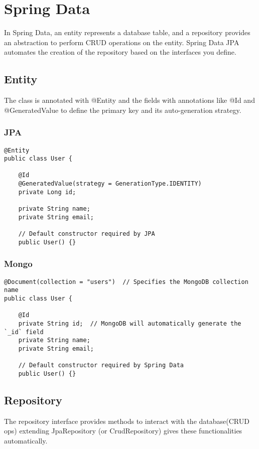 \documentclass[a4paper, 12pt]{article}
\begin{document}
    \newpage


    \section{Spring Data}
    In Spring Data, an entity represents a database table, and a repository provides an abstraction to perform CRUD operations on the entity. Spring Data JPA automates the creation of the repository based on the interfaces you define.

    \subsection{Entity}
    The class is annotated with @Entity and the fields with annotations like @Id and @GeneratedValue to define the primary key and its auto-generation strategy.

    \subsubsection{JPA}
    \begin{lstlisting}
@Entity
public class User {

    @Id
    @GeneratedValue(strategy = GenerationType.IDENTITY)
    private Long id;

    private String name;
    private String email;

    // Default constructor required by JPA
    public User() {}
    \end{lstlisting}

    \subsubsection{Mongo}
    \begin{lstlisting}
@Document(collection = "users")  // Specifies the MongoDB collection name
public class User {

    @Id
    private String id;  // MongoDB will automatically generate the `_id` field
    private String name;
    private String email;

    // Default constructor required by Spring Data
    public User() {}
    \end{lstlisting}

    \subsection{Repository}
    The repository interface provides methods to interact with the database(CRUD ops) extending JpaRepository (or CrudRepository) gives these functionalities automatically.
\end{document}
